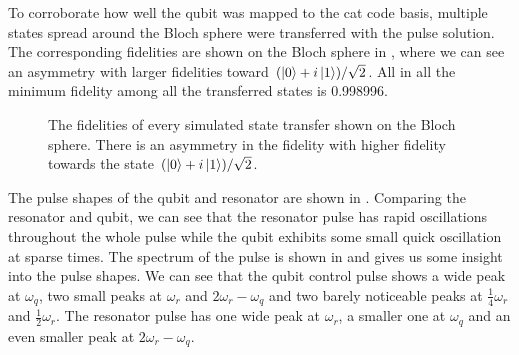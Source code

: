 \documentclass[main.tex]{subfiles}
\begin{document}
To corroborate how well the qubit was mapped to the cat code basis, multiple states spread around the Bloch sphere were transferred with the pulse solution.
The corresponding fidelities are shown on the Bloch sphere in , where we can see an asymmetry with larger fidelities toward \((\ket{0}+i\ket{1})/\sqrt{2}\).
All in all the minimum fidelity among all the transferred states is 0.998996.

\begin{figure}[ht]
	\centering
	\caption{%
	The fidelities of every simulated state transfer shown on the Bloch sphere.
	There is an asymmetry in the fidelity with higher fidelity towards the state \((\ket{0}+i\ket{1})/\sqrt{2}\).
	}%
	\label{fig:bloch-fid}
\end{figure}


The pulse shapes of the qubit and resonator are shown in .
Comparing the resonator and qubit, we can see that the resonator pulse has rapid oscillations throughout the whole pulse while the qubit exhibits some small quick oscillation at sparse times.
The spectrum of the pulse is shown in  and gives us some insight into the pulse shapes.
We can see that the qubit control pulse shows a wide peak at \(\omega_q\), two small peaks at \(\omega_r\) and \(2\omega_r-\omega_q\) and two barely noticeable peaks at \(\frac{1}{4}\omega_r\) and \(\frac{1}{2}\omega_r\). 
The resonator pulse has one wide peak at \(\omega_r\), a smaller one at \(\omega_q\) and an even smaller peak at \(2\omega_r-\omega_q\).
\end{document}
